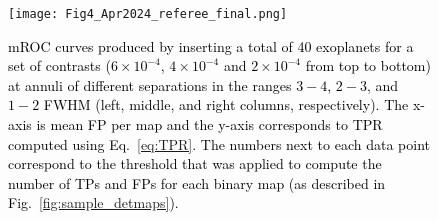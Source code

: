 \documentclass{aa}
\newcommand{\newchange}[1]{\textcolor{black}{#1}}
\begin{document}
\begin{figure}
\centering
    \texttt{[image: Fig4\_Apr2024\_referee\_final.png]}
\caption{ \newchange{mROC curves produced by inserting a total of 40 exoplanets for a set of contrasts ($6 \times 10^{-4}$, $4 \times 10^{-4}$ and $2 \times 10^{-4}$ from top to bottom) at annuli of different separations in the ranges $3-4$, $2-3$, and $1-2$ FWHM (left, middle, and right columns, respectively).
The x-axis is mean FP per map and the y-axis corresponds to TPR computed using Eq.~\ref{eq:TPR}. 
The numbers next to each data point correspond to the threshold that was applied to compute the number of TPs and FPs for each binary map (as described in Fig.~\ref{fig:sample_detmaps}).
}}
    \label{fig:fig_4}
\end{figure}
\end{document}

